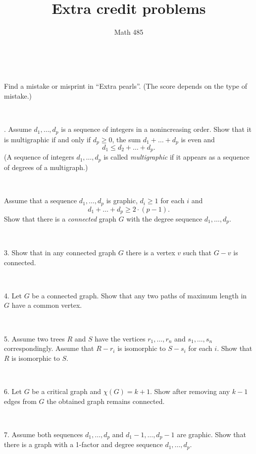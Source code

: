 \documentclass[oneside,a4paper]{article}
\begin{document}
%
\title{Extra credit problems}
\author{Math 485}
\date{}
\maketitle

\textit{}


\ 

 Find a mistake or misprint in ``Extra pearls''.
(The score depends on the type of mistake.)


\ 

.
Assume $d_1,\dots, d_p$ is a sequence of integers in a nonincreasing order.
Show that it is multigraphic if and only if $d_p\ge0$, the sum $d_1+\dots+ d_p$ is even and 
\[d_1\le d_2+\dots+d_p.\]
(A sequence of integers $d_1,\dots, d_p$ is called \textit{multigraphic} if it appears as a sequence of degrees of a multigraph.)

\ 

Assume that a sequence $d_1,\dots, d_p$ is graphic,
$d_i\ge 1$ for each $i$ and 
\[d_1+\dots+d_p\ge 2\cdot(p-1).\]
Show that there is a \textit{connected} graph $G$ with the degree sequence $d_1,\dots, d_p$.


\ 

\noindent 
{3.}
Show that in any connected graph $G$ there is a vertex $v$ such that $G-v$ is connected.

\ 


\noindent
{4.} 
Let $G$ be a  connected graph.
Show that any two paths of maximum length in $G$ have a common vertex.


\ 

\noindent %
{5.} %
Assume two trees $R$ and $S$ 
have the vertices $r_1,\dots,r_n$ and $s_1,\dots,s_n$ correspondingly.
Assume that $R-r_i$ is isomorphic to $S-s_i$ for each $i$.
Show that $R$ is isomorphic to $S$.

\ 

\noindent 
{6.} %
Let $G$ be a critical graph and $\chi(G)=k+1$.
Show after removing any $k-1$ edges from $G$  
the obtained graph remains connected. 

\ 

\noindent %
{7.} %
Assume both sequences $d_1,\dots, d_p$
 and $d_1-1,\dots, d_p-1$ are graphic.
Show that there is a graph with a 1-factor and degree sequence $d_1,\dots, d_p$.

\ 
\end{document}

